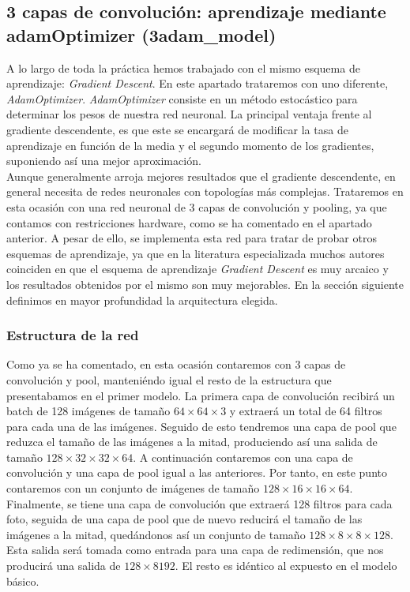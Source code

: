 \documentclass[11pt]{article}
\theoremstyle{plain}
\theoremstyle{definition}
\begin{document}
\subsection{3 capas de convolución: aprendizaje mediante adamOptimizer
  (3adam\_model)}

A lo largo de toda la práctica hemos trabajado con el mismo esquema de
aprendizaje: \textit{Gradient Descent}. En este apartado trataremos
con uno diferente, \textit{AdamOptimizer}. \textit{AdamOptimizer}
consiste en un método estocástico para determinar los pesos de nuestra
red neuronal.  La principal ventaja frente al gradiente descendente,
es que este se encargará de modificar la tasa de aprendizaje en
función de la media y el segundo momento de los gradientes, suponiendo
así una mejor
aproximación.\\

Aunque generalmente arroja mejores resultados que el gradiente
descendente, en general necesita de redes neuronales con topologías
más complejas.  Trataremos en esta ocasión con una red neuronal de 3
capas de convolución y pooling, ya que contamos con restricciones
hardware, como se ha comentado en el apartado anterior. A pesar de
ello, se implementa esta red para tratar de probar otros esquemas de
aprendizaje, ya que en la literatura especializada muchos autores
coinciden en que el esquema de aprendizaje \textit{Gradient Descent}
es muy arcaico y los resultados obtenidos por el mismo son muy
mejorables. En la sección siguiente definimos en mayor profundidad la
arquitectura elegida.

\subsubsection{Estructura de la red}

Como ya se ha comentado, en esta ocasión contaremos con 3 capas de
convolución y pool, manteniéndo igual el resto de la estructura que
presentabamos en el primer modelo. La primera capa de convolución
recibirá un batch de 128 imágenes de tamaño $64 \times 64 \times 3$ y
extraerá un total de 64 filtros para cada una de las imágenes. Seguido
de esto tendremos una capa de pool que reduzca el tamaño de las
imágenes a la mitad, produciendo así una salida de tamaño
$128 \times 32 \times 32 \times 64$.  A continuación contaremos con
una capa de convolución y una capa de pool igual a las anteriores. Por
tanto, en este punto contaremos con un conjunto de imágenes de tamaño
$128 \times 16 \times 16 \times 64$. Finalmente, se tiene una capa de
convolución que extraerá 128 filtros para cada foto, seguida de una
capa de pool que de nuevo reducirá el tamaño de las imágenes a la
mitad, quedándonos así un conjunto de tamaño
$128 \times 8 \times 8 \times 128$. Esta salida será tomada como
entrada para una capa de redimensión, que nos producirá una salida de
$128 \times 8192$. El resto es idéntico al expuesto en el modelo
básico.
\end{document}
